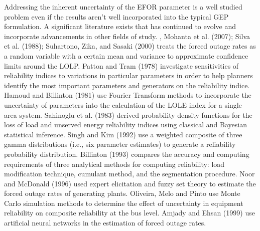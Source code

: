 \documentclass[10pt]{amsart}
\begin{document}
	
	Addressing the inherent uncertainty of the EFOR parameter is a well studied problem even if the results aren't well incorporated into the typical GEP formulation. 
	A significant literature exists that has continued to evolve and incorporate advancements in other fields of study. 
	\cite{barbosa:1977}, Mohanta et al. (2007); Silva et al. (1988); Suhartono, Zika, and Sasaki (2000) treats the forced outage rates as a random variable with a certain mean and variance to approximate confidence limits around the LOLP. 
	Patton and Tram (1978) investigate sensitivities of reliability indices to variations in particular parameters in order to help planners identify the most important parameters and generators on the reliability indice. 
	Hamoud and Billinton (1981) use Fourier Transform methods to incorporate the uncertainty of parameters into the calculation of the LOLE index for a single area system. 
	Sahinoglu et al. (1983) derived probability density functions for the loss of load and unserved energy reliability indices using classical and Bayesian statistical inference. 
	Singh and Kim (1992) use a weighted composite of three gamma distributions (i.e., six parameter estimates) to generate a reliability probability distribution. 
	Billinton (1993) compares the accuracy and computing requirements of three analytical methods for computing reliability: load modification technique, cumulant method, and the segmentation procedure. 
	Noor and McDonald (1996) used expert elicitation and fuzzy set theory to estimate the forced outage rates of generating plants. 
	Oliveira, Melo and Pinto use Monte Carlo simulation methods to determine the effect of uncertainty in equipment reliability on composite reliability at the bus level. 
	Amjady and Ehsan (1999) use artificial neural networks in the estimation of forced outage rates. 
\end{document}
